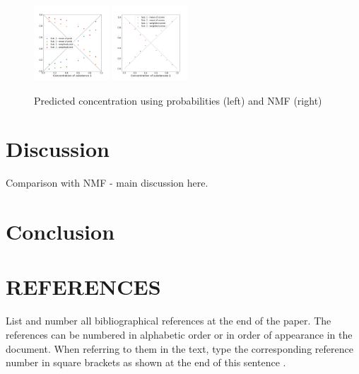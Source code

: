 \documentclass{article}
\begin{document}
\begin{figure}[H]
	\includegraphics[width=0.25\textwidth]{DNN_pred_conc_prob_2.png} \hspace*{-.5cm}
	\includegraphics[width=0.25\textwidth]{nmf_pred_conc_2.png}
	\caption{Predicted concentration using probabilities (left) and NMF (right)}
	\label{fig:comparison}
\end{figure}
\section{Discussion}
\label{sec:discussion}




Comparison with NMF - main discussion here.

\section{Conclusion}
\label{sec:conclusion}



\vfill
\pagebreak



\section{REFERENCES}
\label{sec:ref}

List and number all bibliographical references at the end of the paper.  The references can be numbered in alphabetic order or in order of appearance in the document.  When referring to them in the text, type the corresponding reference number in square brackets as shown at the end of this sentence .



\end{document}
